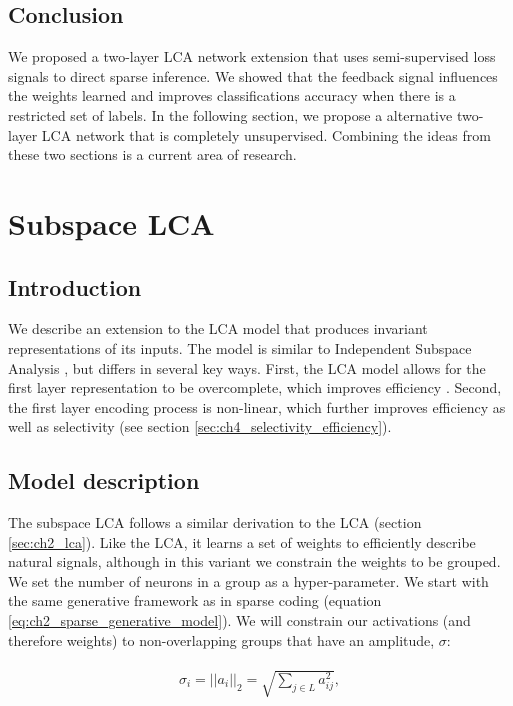 \subsection{Conclusion}
We proposed a two-layer LCA network extension that uses semi-supervised loss signals to direct sparse inference. We showed that the feedback signal influences the weights learned and improves classifications accuracy when there is a restricted set of labels. In the following section, we propose a alternative two-layer LCA network that is completely unsupervised. Combining the ideas from these two sections is a current area of research.

\section{Subspace LCA}\label{sec:ch3_subspace_lca}
\subsection{Introduction}
We describe an extension to the LCA model that produces invariant representations of its inputs. The model is similar to Independent Subspace Analysis \parencite{hyvarinen2000emergence}, but differs in several key ways. First, the LCA model allows for the first layer representation to be overcomplete, which improves efficiency \parencite{lewicki2000learning}. Second, the first layer encoding process is non-linear, which further improves efficiency as well as selectivity (see section \ref{sec:ch4_selectivity_efficiency}).

\subsection{Model description}
The subspace LCA follows a similar derivation to the LCA (section \ref{sec:ch2_lca}). Like the LCA, it learns a set of weights to efficiently describe natural signals, although in this variant we constrain the weights to be grouped. We set the number of neurons in a group as a hyper-parameter. We start with the same generative framework as in sparse coding (equation \ref{eq:ch2_sparse_generative_model}). We will constrain our activations (and therefore weights) to non-overlapping groups that have an amplitude, $\sigma$:

\begin{align}\label{eq:ch3_a_decomp}
\begin{split}
  \sigma_{i} = ||a_{i}||_{2} = \sqrt{\sum_{j\in L}a^{2}_{ij}},
\end{split}
\end{align}

